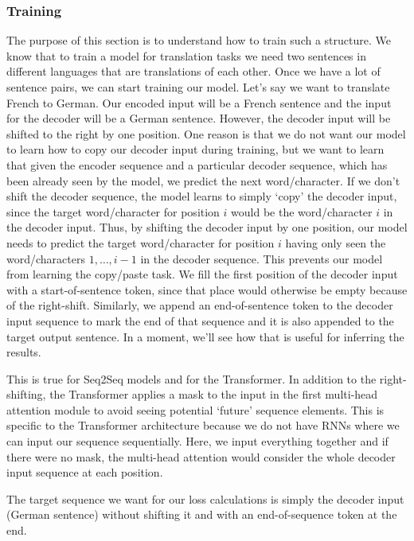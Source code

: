 \subsubsection{Training}
The purpose of this section is to understand how to train such a structure. We know
that to train a model for translation tasks we need two sentences in different languages
that are translations of each other. Once we have a lot of sentence pairs, we can
start training our model. Let's say we want to translate French to German. Our encoded
input will be a French sentence and the input for the decoder will be a German sentence.
However, the decoder input will be shifted to the right by one position. One
reason is that we do not want our model to learn how to copy our decoder input
during training, but we want to learn that given the encoder sequence and a particular
decoder sequence, which has been already seen by the model, we predict the next word/character.
If we don’t shift the decoder sequence, the model learns to simply ‘copy’ the decoder
input, since the target word/character for position $i$ would be the word/character
$i$ in the decoder input. Thus, by shifting the decoder input by one position, our
model needs to predict the target word/character for position $i$ having only seen
the word/characters $1, \hdots, i-1$ in the decoder sequence. This prevents our
model from learning the copy/paste task. We fill the first position of the decoder
input with a start-of-sentence token, since that place would otherwise be empty
because of the right-shift. Similarly, we append an end-of-sentence token to the
decoder input sequence to mark the end of that sequence and it is also appended
to the target output sentence. In a moment, we’ll see how that is useful for
inferring the results.
\newline

This is true for Seq2Seq models and for the Transformer. In addition to the right-shifting,
the Transformer applies a mask to the input in the first multi-head attention
module to avoid seeing potential ‘future’ sequence elements. This is specific to
the Transformer architecture because we do not have RNNs where we can input our sequence
sequentially. Here, we input everything together and if there were no mask, the
multi-head attention would consider the whole decoder input sequence at each
position.
\newline

The target sequence we want for our loss calculations is simply the decoder
input (German sentence) without shifting it and with an end-of-sequence token at
the end.

